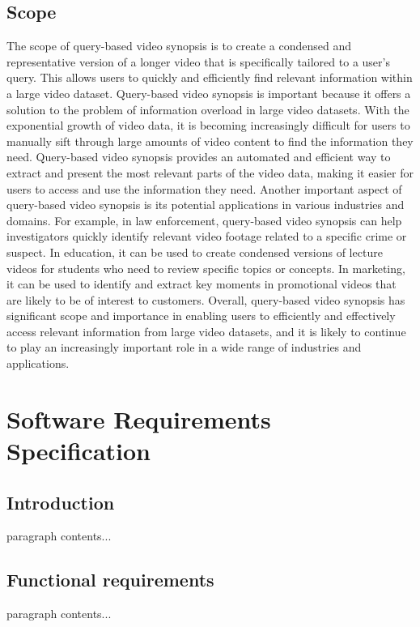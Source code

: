 \documentclass[12pt,a4paper]{report}
\begin{document}
\section{Scope}
The scope of query-based video synopsis is to create a condensed and representative version of a longer video that is specifically tailored to a user's query. This allows users to quickly and efficiently find relevant information within a large video dataset.
Query-based video synopsis is important because it offers a solution to the problem of information overload in large video datasets. With the exponential growth of video data, it is becoming increasingly difficult for users to manually sift through large amounts of video content to find the information they need. Query-based video synopsis provides an automated and efficient way to extract and present the most relevant parts of the video data, making it easier for users to access and use the information they need.
Another important aspect of query-based video synopsis is its potential applications in various industries and domains. For example, in law enforcement, query-based video synopsis can help investigators quickly identify relevant video footage related to a specific crime or suspect. In education, it can be used to create condensed versions of  lecture videos for students who need to review specific topics or concepts. In marketing, it can be used to identify and extract key moments in promotional videos that are likely to be of interest to customers.
Overall, query-based video synopsis has significant scope and importance in enabling users to efficiently and effectively access relevant information from large video datasets, and it is likely to continue to play an increasingly important role in a wide range of industries and applications.



\chapter{Software Requirements Specification}
\section{Introduction}

paragraph contents... 

\section{Functional requirements}
paragraph contents... 
\end{document}
